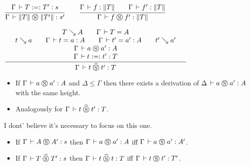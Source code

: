 \documentclass[a4paper,english]{lipics-utf8x}
\begin{document}
  \begin{mathc}
  \end{mathc}

  \begin{mathc}
  \end{mathc}

  \begin{center}
  \(
    \ru{\Gamma \der T :=: T' : s
      }{\Gamma \der \squash{T} \Sr \squash{T'} : s'}
    \qquad
    \ru{\Gamma \der f : \squash{T} \qquad
        \Gamma \der f' : \squash{T}
      }{\Gamma \der f \Sr f' : \squash{T}}
  \)
  \end{center}

  \begin{center}
  \(
    \qru{T \rew A \qquad
         \Gamma \der T = A
       }{t \rew a \qquad
         \Gamma \der t = a : A \qquad
         \Gamma \der t' = a' : A \qquad
         t' \rew a'
       }{\Gamma \der a \Sr a' : A
       }{\Gamma \der t :=: t' : T
       }{\Gamma \der t \hSr t' : T}
  \)
  \end{center}

  \begin{lemma}[Weakening]
    \leavevmode
    \begin{itemize}
      \item If $\Gamma \,\vdash a \mathrel{\circledS} a' : A$ and $\Delta \le \Gamma$ then there
      exists a derivation of $\Delta \,\vdash a \mathrel{\circledS} a' : A$ with the same height.
      \item Analogously for $\Gamma \,\vdash t \mathrel{\widehat{\mathrel{\circledS}}} t' : T$.
    \end{itemize}
  \end{lemma}
  I dont' believe it's necessary to focus on this one.

  \begin{lemma}
    \label{lem:s-conv}
    \leavevmode
    \begin{itemize}
      \item If $\Gamma \,\vdash A \mathrel{\circledS} A' : s$ then
      $\Gamma \,\vdash a \mathrel{\circledS} a' : A$ iff $\Gamma \,\vdash a \mathrel{\circledS} a' : A'$.
      \item If $\Gamma \,\vdash T \mathrel{\widehat{\mathrel{\circledS}}} T' : s$ then
      $\Gamma \,\vdash t \mathrel{\widehat{\mathrel{\circledS}}} t : T$ iff $\Gamma \,\vdash t \mathrel{\circledS} t' : T'$.
    \end{itemize}
  \end{lemma}
\end{document}
